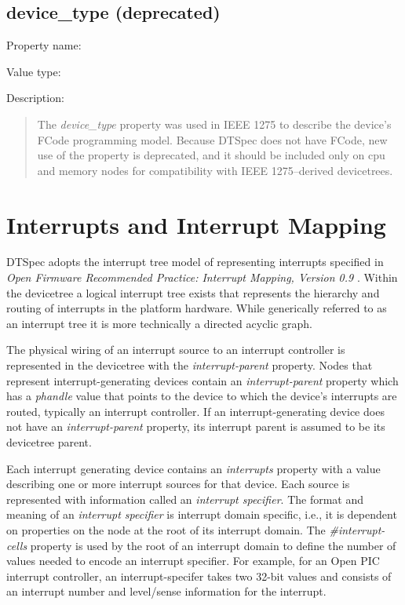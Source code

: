 \documentclass[a4paper,10pt,oneside]{sphinxmanual}
\begin{document}
\subsection{device\_type (deprecated)}
\label{devicetree-basics:device-type-deprecated}
Property name: 

Value type: 

Description:
\begin{quote}

The \emph{device\_type} property was used in IEEE 1275 to describe the
device’s FCode programming model. Because DTSpec does not have FCode, new
use of the property is deprecated, and it should be included only on cpu
and memory nodes for compatibility with IEEE 1275–derived devicetrees.
\end{quote}


\section{Interrupts and Interrupt Mapping}
\label{devicetree-basics:sect-interrupts}\label{devicetree-basics:interrupts-and-interrupt-mapping}
DTSpec adopts the interrupt tree model of representing interrupts
specified in \emph{Open Firmware Recommended Practice: Interrupt Mapping,
Version 0.9} \label{devicetree-basics:id1}{\hyperref[references:b7]{\crossref{{[}b7{]}}}}. Within the devicetree a logical interrupt tree exists
that represents the hierarchy and routing of interrupts in the platform
hardware. While generically referred to as an interrupt tree it is more
technically a directed acyclic graph.

The physical wiring of an interrupt source to an interrupt controller is
represented in the devicetree with the \emph{interrupt-parent} property.
Nodes that represent interrupt-generating devices contain an
\emph{interrupt-parent} property which has a \emph{phandle} value that points to
the device to which the device’s interrupts are routed, typically an
interrupt controller. If an interrupt-generating device does not have an
\emph{interrupt-parent} property, its interrupt parent is assumed to be its
devicetree parent.

Each interrupt generating device contains an \emph{interrupts} property with
a value describing one or more interrupt sources for that device. Each
source is represented with information called an \emph{interrupt specifier}.
The format and meaning of an \emph{interrupt specifier} is interrupt domain
specific, i.e., it is dependent on properties on the node at the root of
its interrupt domain. The \emph{\#interrupt-cells} property is used by the
root of an interrupt domain to define the number of  values
needed to encode an interrupt specifier. For example, for an Open PIC
interrupt controller, an interrupt-specifer takes two 32-bit values and
consists of an interrupt number and level/sense information for the
interrupt.
\end{document}
